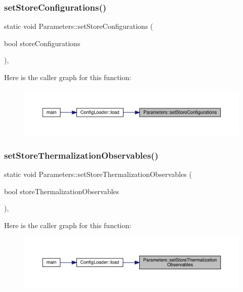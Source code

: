 \subsubsection{\texorpdfstring{setStoreConfigurations()}{setStoreConfigurations()}}
{\footnotesize\ttfamily static void Parameters\+::set\+Store\+Configurations (\begin{DoxyParamCaption}\item[{bool}]{store\+Configurations }\end{DoxyParamCaption})\hspace{0.3cm}{\ttfamily [inline]}, {\ttfamily [static]}}

Here is the caller graph for this function\+:
\nopagebreak
\begin{figure}[H]
\begin{center}
\leavevmode
\includegraphics[width=350pt]{class_parameters_a7ab55c1529015de4c5c182cfa9f004e8_icgraph}
\end{center}
\end{figure}
\mbox{\label{class_parameters_a84290346277f15c8241c035b7aa452ad}} 
\subsubsection{\texorpdfstring{setStoreThermalizationObservables()}{setStoreThermalizationObservables()}}
{\footnotesize\ttfamily static void Parameters\+::set\+Store\+Thermalization\+Observables (\begin{DoxyParamCaption}\item[{bool}]{store\+Thermalization\+Observables }\end{DoxyParamCaption})\hspace{0.3cm}{\ttfamily [inline]}, {\ttfamily [static]}}

Here is the caller graph for this function\+:
\nopagebreak
\begin{figure}[H]
\begin{center}
\leavevmode
\includegraphics[width=350pt]{class_parameters_a84290346277f15c8241c035b7aa452ad_icgraph}
\end{center}
\end{figure}
\mbox{\label{class_parameters_af882fdb68c96c27f1bb99cebe3aecd21}} 
